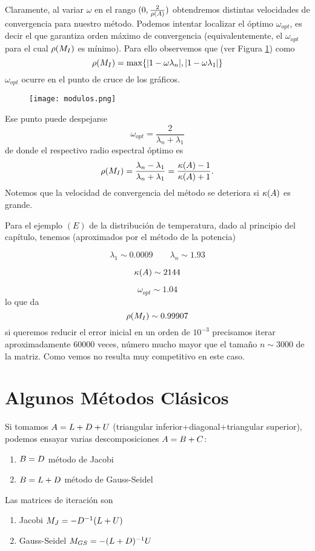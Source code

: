 Claramente, al variar $\omega$ en el rango $(0,\frac{2}{\rho(\Ab)})$ obtendremos distintas velocidades de convergencia para nuestro método. Podemos intentar localizar el óptimo $\omega_{opt}$, es decir el que garantiza orden máximo de convergencia (equivalentemente, el $\omega_{opt}$ para el cual $\rho(\Mb_I)$ es mínimo). Para ello observemos que   (ver Figura \ref{fig:modulos}) como
$$
\rho(\Mb_I)=\max\{
|1-\omega   \lambda_n|,|1-\omega   \lambda_1|\}
$$
$\omega_{opt}$ ocurre en el punto de cruce de los gráficos.
\begin{figure}[h]
\label{fig:modulos}
\centering\texttt{[image: modulos.png]}
\end{figure}
Ese punto puede despejarse
$$
\omega_{opt}=\frac{2}{\lambda_n+\lambda_1}
$$
de donde el respectivo radio espectral óptimo es
$$\rho(\Mb_I)=\frac{\lambda_n-\lambda_1}{\lambda_n+\lambda_1}=\frac{\kappa(\Ab)-1}{\kappa(\Ab)+1}.
$$
Notemos que la velocidad de convergencia del método se deteriora si  $\kappa(\Ab)$ es grande.

\tcc
Para el ejemplo $(E)$ de la distribución de temperatura, dado al principio del capítulo, tenemos (aproximados por el método de la potencia)

$$
\lambda_1\sim 0.0009 \qquad \lambda_n \sim 1.93
$$

$$\kappa(\Ab)\sim 2144$$

$$\omega_{opt}\sim
1.04$$
lo que da
$$\rho(\Mb_I)\sim 0.99907$$
si queremos reducir  el error inicial en un orden  de $10^{-3}$ precisamos iterar aproximadamente $60000$ veces, número mucho mayor que el tamaño  $n\sim 3000$ de la matriz. Como vemos no resulta muy competitivo en este caso.
\etcc


\section{Algunos Métodos Clásicos}



Si tomamos $\Ab=\Lb+\Db+\Ub$ (triangular inferior+diagonal+triangular superior), podemos ensayar varias descomposiciones $\Ab=\Bb+\Cb$:
\begin{enumerate}
 \item $\Bb=\Db$ método de Jacobi
 \item $\Bb=\Lb+\Db$ método de Gauss-Seidel
\end{enumerate}

Las matrices de iteración son
\begin{enumerate}
 \item Jacobi $\Mb_J=-\Db^{-1}(\Lb+\Ub)$
 \item Gauss-Seidel $\Mb_{GS}=-(\Lb+\Db)^{-1}\Ub$
\end{enumerate}

